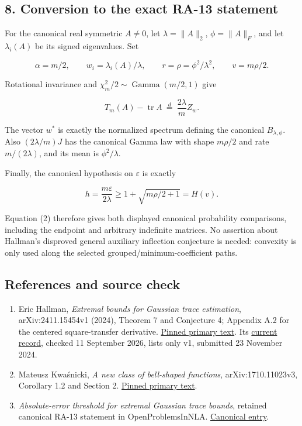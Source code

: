 \documentclass[10pt,a4paper]{article}
\providecommand{\tightlist}{\setlength{\itemsep}{0pt}\setlength{\parskip}{0pt}}
\begin{document}
\subsection{8. Conversion to the exact RA-13
statement}\label{conversion-to-the-exact-ra-13-statement}

For the canonical real symmetric \(A\ne0\), let \(\lambda=\|A\|_2\),
\(\phi=\|A\|_F\), and let \(\lambda_i(A)\) be its signed eigenvalues.
Set

\[
\alpha=m/2,\qquad w_i=\lambda_i(A)/\lambda,
\qquad r=\rho=\phi^2/\lambda^2,\qquad v=m\rho/2.
\]

Rotational invariance and \(\chi_m^2/2\sim\operatorname{Gamma}(m/2,1)\)
give

\[
T_m(A)-\operatorname{tr}A\ \stackrel d=\ \frac{2\lambda}{m}Z_w.
\]

The vector \(w^*\) is exactly the normalized spectrum defining the
canonical \(B_{\lambda,\phi}\). Also \((2\lambda/m)J\) has the canonical
Gamma law with shape \(m\rho/2\) and rate \(m/(2\lambda)\), and its mean
is \(\phi^2/\lambda\).

Finally, the canonical hypothesis on \(\varepsilon\) is exactly

\[
h=\frac{m\varepsilon}{2\lambda}
\ge1+\sqrt{m\rho/2+1}=H(v).
\]

Equation (2) therefore gives both displayed canonical probability
comparisons, including the endpoint and arbitrary indefinite matrices.
No assertion about Hallman's disproved general auxiliary inflection
conjecture is needed: convexity is only used along the selected
grouped/minimum-coefficient paths.

\subsection{References and source
check}\label{references-and-source-check}

\begin{enumerate}
\def\labelenumi{\arabic{enumi}.}
\tightlist
\item
  Eric Hallman, \emph{Extremal bounds for Gaussian trace estimation},
  arXiv:2411.15454v1 (2024), Theorem 7 and Conjecture 4; Appendix A.2
  for the centered square-transfer derivative.
  \href{https://arxiv.org/html/2411.15454v1}{Pinned primary text}. Its
  \href{https://arxiv.org/abs/2411.15454}{current record}, checked 11
  September 2026, lists only v1, submitted 23 November 2024.
\item
  Mateusz Kwaśnicki, \emph{A new class of bell-shaped functions},
  arXiv:1710.11023v3, Corollary 1.2 and Section 2.
  \href{https://arxiv.org/html/1710.11023v3}{Pinned primary text}.
\item
  \emph{Absolute-error threshold for extremal Gaussian trace bounds},
  retained canonical RA-13 statement in OpenProblemsInNLA.
  \href{https://github.com/ajt60gaibb/OpenProblemsInNLA/blob/main/randomized-and-low-rank-approximation/RA-13/README.md}{Canonical
  entry}.
\end{enumerate}
\end{document}
